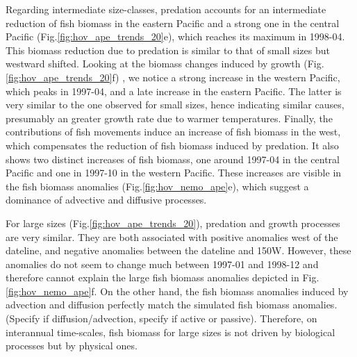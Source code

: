 Regarding intermediate size-classes, predation accounts for an intermediate reduction of fish biomass in the eastern Pacific and a strong one in the central Pacific (Fig.\ref{fig:hov_ape_trends_20}e), which reaches its maximum in 1998-04. This biomass reduction due to predation is similar to that of small sizes but westward shifted. Looking at the biomass  changes induced by growth (Fig.\ref{fig:hov_ape_trends_20}f) , we notice a strong increase in the western Pacific, which peaks in 1997-04, and a late increase  in the eastern Pacific. The latter is very similar to the one observed for small sizes, hence indicating similar causes, presumably an greater growth rate due to warmer temperatures. Finally, the contributions of fish movements induce an increase of fish biomass in the west, which compensates the reduction of fish biomass induced by predation. It also shows two distinct increases of fish biomass, one around 1997-04 in the central Pacific and one in 1997-10 in the western Pacific. These increases are visible in the fish biomass anomalies (Fig.\ref{fig:hov_nemo_ape}e), which suggest a dominance of advective and diffusive processes.

For large sizes (Fig.\ref{fig:hov_ape_trends_20}), predation and growth processes are very similar. They are both associated with positive anomalies west of the dateline, and negative anomalies between the dateline and 150W. However, these anomalies do not seem to change much between 1997-01 and 1998-12 and therefore cannot explain the large fish biomass anomalies depicted in Fig.\ref{fig:hov_nemo_ape}f. On the other hand, the fish biomass anomalies induced by advection and diffusion perfectly match the simulated fish biomass anomalies. \warn(Specify if diffusion/advection, specify if active or passive). Therefore, on interannual time-scales, fish biomass for large sizes is not driven by biological processes but by physical ones.

